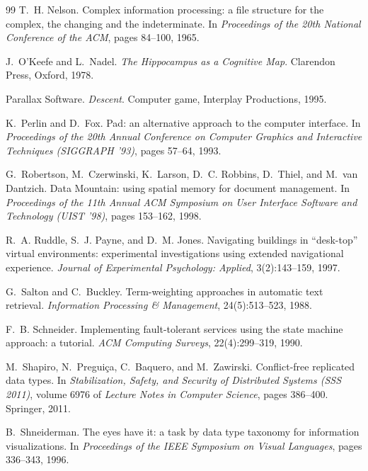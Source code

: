 \documentclass[11pt]{article}
\theoremstyle{remark}
\begin{document}
\begin{thebibliography}{99}
T.~H. Nelson.
\newblock Complex information processing: a file structure for the complex, the changing and the indeterminate.
\newblock In \emph{Proceedings of the 20th National Conference of the ACM}, pages 84--100, 1965.

J.~O'Keefe and L.~Nadel.
\newblock \emph{The Hippocampus as a Cognitive Map}.
\newblock Clarendon Press, Oxford, 1978.

Parallax Software.
\newblock \emph{Descent}.
\newblock Computer game, Interplay Productions, 1995.

K.~Perlin and D.~Fox.
\newblock Pad: an alternative approach to the computer interface.
\newblock In \emph{Proceedings of the 20th Annual Conference on Computer Graphics and Interactive Techniques (SIGGRAPH '93)}, pages 57--64, 1993.

G.~Robertson, M.~Czerwinski, K.~Larson, D.~C. Robbins, D.~Thiel, and M.~van Dantzich.
\newblock Data Mountain: using spatial memory for document management.
\newblock In \emph{Proceedings of the 11th Annual ACM Symposium on User Interface Software and Technology (UIST '98)}, pages 153--162, 1998.

R.~A. Ruddle, S.~J. Payne, and D.~M. Jones.
\newblock Navigating buildings in ``desk-top'' virtual environments: experimental investigations using extended navigational experience.
\newblock \emph{Journal of Experimental Psychology: Applied}, 3(2):143--159, 1997.

G.~Salton and C.~Buckley.
\newblock Term-weighting approaches in automatic text retrieval.
\newblock \emph{Information Processing \& Management}, 24(5):513--523, 1988.

F.~B. Schneider.
\newblock Implementing fault-tolerant services using the state machine approach: a tutorial.
\newblock \emph{ACM Computing Surveys}, 22(4):299--319, 1990.

M.~Shapiro, N.~Preguiça, C.~Baquero, and M.~Zawirski.
\newblock Conflict-free replicated data types.
\newblock In \emph{Stabilization, Safety, and Security of Distributed Systems (SSS 2011)}, volume 6976 of \emph{Lecture Notes in Computer Science}, pages 386--400. Springer, 2011.

B.~Shneiderman.
\newblock The eyes have it: a task by data type taxonomy for information visualizations.
\newblock In \emph{Proceedings of the IEEE Symposium on Visual Languages}, pages 336--343, 1996.


\end{thebibliography}
\end{document}
